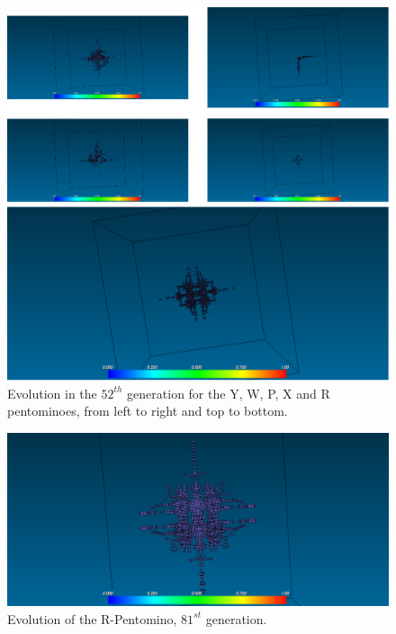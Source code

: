 \begin{figure}[H]
	\centering
	\includegraphics[scale=0.4]{pentominoes_ss/r-comparative-70g.png}
	\caption{Evolution in the $52^{th}$ generation for the Y, W, P, X and R
	pentominoes, from left to right and top to bottom.}
  \label{fig:ss-pent:r-comparative}
\end{figure}

\begin{figure}[H]
	\centering
	\includegraphics[scale=0.3]{pentominoes_ss/r_81.png}
	\caption{Evolution of the R-Pentomino, $81^{st}$ generation.}
  \label{fig:ss-pent:r-81}
\end{figure}

